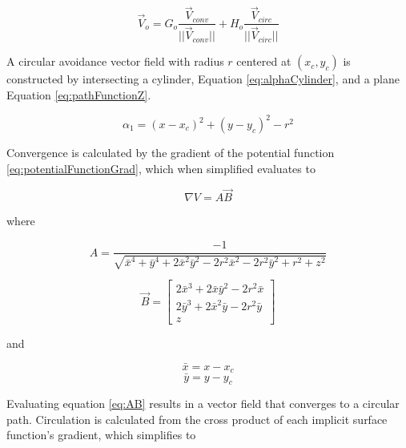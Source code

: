 \documentclass[numbered,pdftex]{ohio-etd}
\begin{document}
\begin{equation}
\overrightarrow{V}_{o} = G_o\frac{\overrightarrow{V}_{conv}}{||\overrightarrow{V}_{conv}||}+H_o\frac{\overrightarrow{V}_{circ}}{||\overrightarrow{V}_{circ}||}
\label{eq:obstComponents}
\end{equation}



A circular avoidance vector field with radius $r$ centered at $(x_c,y_c)$ is constructed by intersecting a cylinder, Equation \ref{eq:alphaCylinder}, and a plane Equation \ref{eq:pathFunctionZ}. 

\begin{equation}\label{eq:alphaCylinder}
\alpha_1 = (x-x_c)^2 + (y-y_c)^2-r^2
\end{equation}


Convergence is calculated by the gradient of the potential function \ref{eq:potentialFunctionGrad}, which when simplified evaluates to

\begin{equation}
\nabla V = A\overrightarrow{B}
\label{eq:AB}
\end{equation}

\noindent
where


\begin{equation}
A = \dfrac{-1}{\sqrt{\bar{x}^4+\bar{y}^4+2\bar{x}^2\bar{y}^2-2r^2\bar{x}^2-2r^2\bar{y}^2+r^2+z^2}}
\end{equation}

\begin{equation}
\overrightarrow{B} = \begin{bmatrix} 2\bar{x}^3+2\bar{x}\bar{y}^2-2r^2\bar{x} \\ 2\bar{y}^3+2\bar{x}^2\bar{y}-2r^2\bar{y} \\z \end{bmatrix}
\end{equation}

\noindent
and


\begin{equation}
\bar{x} = x - x_c
\end{equation}
\begin{equation}
\bar{y} = y - y_c
\end{equation}


Evaluating equation \ref{eq:AB} results in a vector field that converges to a circular path. Circulation is calculated from the cross product of each implicit surface function's gradient, which simplifies to
\end{document}
